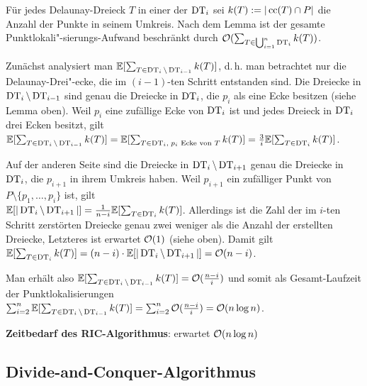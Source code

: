 \begin{Beweis}
    Für jedes Delaunay-Dreieck $T$ in einer der $\operatorname{DT}_i$ sei
    $k(T) := |\operatorname{cc}(T) \cap P|$ die Anzahl der Punkte in seinem Umkreis.
    Nach dem Lemma ist der gesamte  Punktlokali"-sierungs-Aufwand beschränkt durch
    $\mathcal{O}(\sum_{T \in \bigcup_{i=1}^n \operatorname{DT}_i} k(T))$.
    
    Zunächst analysiert man $\mathbb{E}[\sum_{T \in \operatorname{DT}_i \setminus \operatorname{DT}_{i-1}} k(T)]$,
    d.\,h. man betrachtet nur die Delaunay-Drei"-ecke, die im $(i-1)$-ten Schritt entstanden sind.
    Die Dreiecke in $\operatorname{DT}_i \setminus \operatorname{DT}_{i-1}$ sind genau die Dreiecke
    in $\operatorname{DT}_i$, die $p_i$ als eine Ecke besitzen (siehe Lemma oben).
    Weil $p_i$ eine
    zufällige Ecke von $\operatorname{DT}_i$ ist und jedes Dreieck in $\operatorname{DT}_i$ drei Ecken besitzt, gilt\\
    $\mathbb{E}[\sum_{T \in \operatorname{DT}_i \setminus \operatorname{DT}_{i-1}} k(T)]
    = \mathbb{E}[\sum_{T \in \operatorname{DT}_i,\; \text{$p_i$ Ecke von $T$}} k(T)]
    = \frac{3}{i} \mathbb{E}[\sum_{T \in \operatorname{DT}_i} k(T)]$.
    
    Auf der anderen Seite sind die Dreiecke in $\operatorname{DT}_i \setminus \operatorname{DT}_{i+1}$ genau die Dreiecke
    in $\operatorname{DT}_i$, die $p_{i+1}$ in ihrem Umkreis haben.
    Weil $p_{i+1}$ ein zufälliger Punkt von $P \setminus \{p_1, \dotsc, p_i\}$ ist, gilt\\
    $\mathbb{E}[|\operatorname{DT}_i \setminus \operatorname{DT}_{i+1}|] = \frac{1}{n-i} \mathbb{E}[\sum_{T \in \operatorname{DT}_i} k(T)]$.
    Allerdings ist die Zahl der im $i$-ten Schritt zerstörten Dreiecke genau zwei weniger als
    die Anzahl der erstellten Dreiecke, Letzteres ist erwartet $\mathcal{O}(1)$ (siehe oben).
    Damit gilt
    $\mathbb{E}[\sum_{T \in \operatorname{DT}_i} k(T)] = (n-i) \cdot \mathbb{E}[|\operatorname{DT}_i \setminus \operatorname{DT}_{i+1}|] = \mathcal{O}(n - i)$.
    
    Man erhält also $\mathbb{E}[\sum_{T \in \operatorname{DT}_i \setminus \operatorname{DT}_{i-1}} k(T)] = \mathcal{O}(\frac{n - i}{i})$ und
    somit als Gesamt-Laufzeit der Punktlokalisierungen
    $\sum_{i=2}^n \mathbb{E}[\sum_{T \in \operatorname{DT}_i \setminus \operatorname{DT}_{i-1}} k(T)] =
    \sum_{i=2}^n \mathcal{O}(\frac{n-i}{i}) = \mathcal{O}(n \log n)$.
\end{Beweis}

\linie

\textbf{Zeitbedarf des RIC-Algorithmus}:
erwartet $\mathcal{O}(n \log n)$

\pagebreak

\subsection{%
    Divide-and-Conquer-Algorithmus%
}

